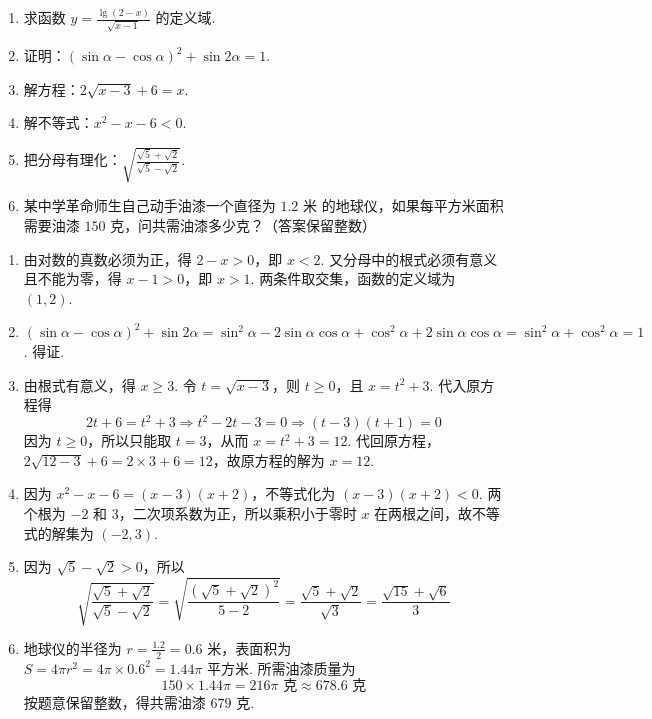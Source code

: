 \begin{problem}
\begin{enumerate}
    \item 求函数 \( y=\frac{\lg\left( 2-x \right)}{\sqrt{x-1}} \) 的定义域.

    \item 证明：\( \left( \sin \alpha-\cos \alpha \right)^2+\sin 2\alpha=1 \).

    \item 解方程：\( 2\sqrt{x-3}+6=x \).

    \item 解不等式：\( x^2-x-6<0 \).

    \item 把分母有理化：\( \sqrt{\frac{\sqrt{5}+\sqrt{2}}{\sqrt{5}-\sqrt{2}}} \).

    \item 某中学革命师生自己动手油漆一个直径为 \( 1.2\text{ 米}\) 的地球仪，如果每平方米面积需要油漆 \( 150\text{ 克}\)，问共需油漆多少克？（答案保留整数）
\end{enumerate}
\end{problem}

\begin{solution}
\begin{enumerate}
    \item 由对数的真数必须为正，得 \( 2-x>0\)，即 \(x<2\). 又分母中的根式必须有意义且不能为零，得 \(x-1>0\)，即 \(x>1\). 两条件取交集，函数的定义域为 \(\left(1,2\right)\).

    \item \( \left(\sin\alpha-\cos\alpha\right)^2+\sin2\alpha=\sin^2\alpha-2\sin\alpha\cos\alpha+\cos^2\alpha+2\sin\alpha\cos\alpha=\sin^2\alpha+\cos^2\alpha=1\). 得证.

    \item 由根式有意义，得 \(x\geq3\). 令 \(t=\sqrt{x-3}\)，则 \(t\geq0\)，且 \(x=t^2+3\). 代入原方程得
    \[
    2t+6=t^2+3\Longrightarrow t^2-2t-3=0\Longrightarrow \left(t-3\right)\left(t+1\right)=0
    \]
    因为 \(t\geq0\)，所以只能取 \(t=3\)，从而 \(x=t^2+3=12\). 代回原方程，\( 2\sqrt{12-3}+6=2\times3+6=12\)，故原方程的解为 \(x=12\).

    \item 因为 \(x^2-x-6=\left(x-3\right)\left(x+2\right)\)，不等式化为 \(\left(x-3\right)\left(x+2\right)<0\). 两个根为 \(-2\) 和 \(3\)，二次项系数为正，所以乘积小于零时 \(x\) 在两根之间，故不等式的解集为 \(\left(-2,3\right)\).

    \item 因为 \( \sqrt5-\sqrt2>0\)，所以
    \[
    \sqrt{\frac{\sqrt5+\sqrt2}{\sqrt5-\sqrt2}}=\sqrt{\frac{\left(\sqrt5+\sqrt2\right)^2}{5-2}}=\frac{\sqrt5+\sqrt2}{\sqrt3}=\frac{\sqrt{15}+\sqrt6}{3}
    \]

    \item 地球仪的半径为 \(r=\frac{1.2}{2}=0.6\text{ 米}\)，表面积为 \( S=4\pi r^2=4\pi\times0.6^2=1.44\pi\text{ 平方米}\). 所需油漆质量为
    \[
    150\times1.44\pi=216\pi\text{ 克}\approx678.6\text{ 克}
    \]
    按题意保留整数，得共需油漆 \( 679\text{ 克}\).
\end{enumerate}
\end{solution}

